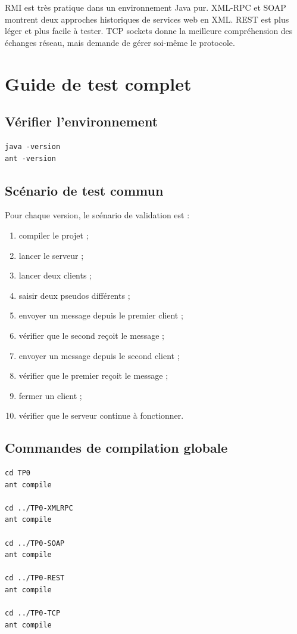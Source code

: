 \documentclass[12pt,a4paper]{report}
\begin{document}
RMI est très pratique dans un environnement Java pur. XML-RPC et SOAP montrent deux approches historiques de services web en XML. REST est plus léger et plus facile à tester. TCP sockets donne la meilleure compréhension des échanges réseau, mais demande de gérer soi-même le protocole.

\chapter{Guide de test complet}

\section{Vérifier l'environnement}

\begin{lstlisting}[style=code,caption={Vérification Java et Ant}]
java -version
ant -version
\end{lstlisting}

\section{Scénario de test commun}

Pour chaque version, le scénario de validation est :

\begin{enumerate}
    \item compiler le projet ;
    \item lancer le serveur ;
    \item lancer deux clients ;
    \item saisir deux pseudos différents ;
    \item envoyer un message depuis le premier client ;
    \item vérifier que le second reçoit le message ;
    \item envoyer un message depuis le second client ;
    \item vérifier que le premier reçoit le message ;
    \item fermer un client ;
    \item vérifier que le serveur continue à fonctionner.
\end{enumerate}

\section{Commandes de compilation globale}

\begin{lstlisting}[style=code,caption={Compiler toutes les versions}]
cd TP0
ant compile

cd ../TP0-XMLRPC
ant compile

cd ../TP0-SOAP
ant compile

cd ../TP0-REST
ant compile

cd ../TP0-TCP
ant compile
\end{lstlisting}
\end{document}
